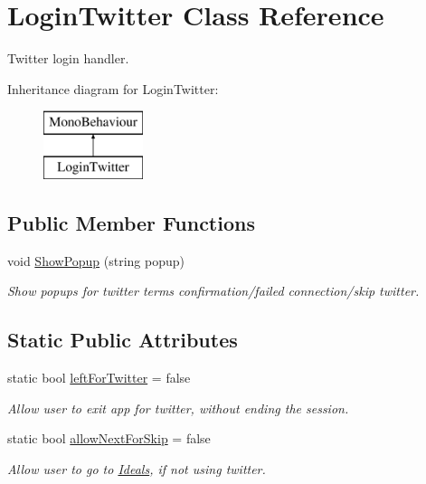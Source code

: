 \hypertarget{class_login_twitter}{}\section{Login\+Twitter Class Reference}
\label{class_login_twitter}


Twitter login handler.  


Inheritance diagram for Login\+Twitter\+:\begin{figure}[H]
\begin{center}
\leavevmode
\includegraphics[height=2.000000cm]{class_login_twitter}
\end{center}
\end{figure}
\subsection*{Public Member Functions}
\begin{DoxyCompactItemize}
\item 
void \mbox{\hyperlink{class_login_twitter_aa41d307ac0099b8dd187f05d3d2aeab3}{Show\+Popup}} (string popup)
\begin{DoxyCompactList}\small\item\em Show popups for twitter terms confirmation/failed connection/skip twitter. \end{DoxyCompactList}\end{DoxyCompactItemize}
\subsection*{Static Public Attributes}
\begin{DoxyCompactItemize}
\item 
static bool \mbox{\hyperlink{class_login_twitter_a6719de883466089832df2f9f5189629e}{left\+For\+Twitter}} = false
\begin{DoxyCompactList}\small\item\em Allow user to exit app for twitter, without ending the session. \end{DoxyCompactList}\item 
static bool \mbox{\hyperlink{class_login_twitter_ab5b6026e105743976dbc6d21ce55f83c}{allow\+Next\+For\+Skip}} = false
\begin{DoxyCompactList}\small\item\em Allow user to go to \mbox{\hyperlink{class_ideals}{Ideals}}, if not using twitter. \end{DoxyCompactList}\end{DoxyCompactItemize}
